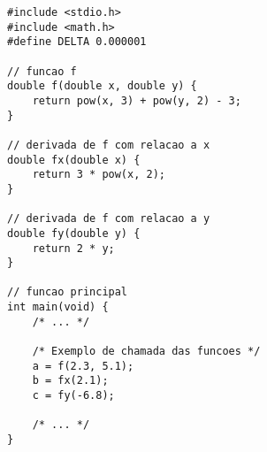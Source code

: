 \documentclass{article}
\begin{document}
        \begin{lstlisting}
#include <stdio.h>
#include <math.h>
#define DELTA 0.000001

// funcao f
double f(double x, double y) {
    return pow(x, 3) + pow(y, 2) - 3;
}

// derivada de f com relacao a x
double fx(double x) {
    return 3 * pow(x, 2);
}

// derivada de f com relacao a y
double fy(double y) {
    return 2 * y;
}

// funcao principal
int main(void) {
    /* ... */

    /* Exemplo de chamada das funcoes */
    a = f(2.3, 5.1);
    b = fx(2.1);
    c = fy(-6.8);

    /* ... */
}
        \end{lstlisting}
\end{document}
